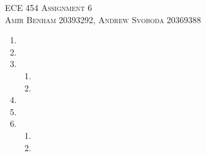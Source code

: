 \documentclass{article}
\begin{document}
\begin{center}
\textsc{\Large ECE 454 Assignment 6}\\[0.5cm]
\textsc{Amir Benham 20393292, Andrew Svoboda 20369388}\\[0.5cm]
\end{center}

\begin{enumerate}

	\item  

	\item  

	\item  

	\begin{enumerate}

		\item

		\item

	\end{enumerate}

	\item  

	\item  

	\item  

	\begin{enumerate}

		\item

		\item

	\end{enumerate}

\end{enumerate}
\end{document}

